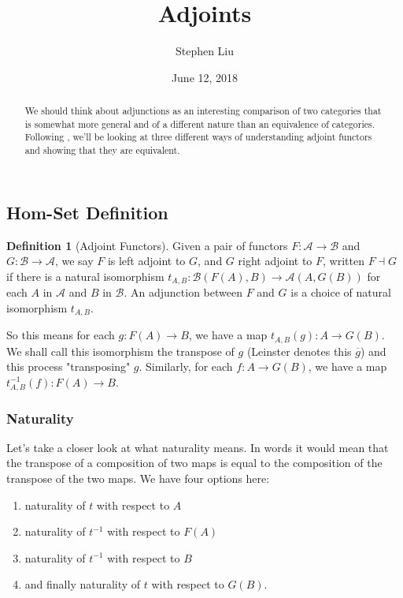 \documentclass[11pt]{article}
\theoremstyle{definition}
\newtheorem*{defn}{Definition}
\theoremstyle{definition}
\theoremstyle{plain}
\theoremstyle{plain}
\theoremstyle{plain}
\begin{document}
\author{Stephen Liu}
\title{Adjoints}
\date{June 12, 2018}

\maketitle

\begin{abstract}
We should think about adjunctions as an interesting comparison of two categories that is somewhat more general and of a different nature than an equivalence of categories. Following \cite{leinster_basic_2014}, we'll be looking at three different ways of understanding adjoint functors and showing that they are equivalent.
\end{abstract}

\subsection*{Hom-Set Definition}
\begin{defn}[Adjoint Functors]
Given a pair of functors $F:\mathscr{A}\to\mathscr{B}$ and $G:\mathscr{B}\to\mathscr{A}$, we say $F$ is left adjoint to $G$, and $G$ right adjoint to $F$, written $F \dashv G$ if there is a natural isomorphism $t_{A,B}:\mathscr{B}(F(A),B) \to \mathscr{A}(A,G(B))$ for each $A$ in $\mathscr{A}$ and $B$ in $\mathscr{B}$. An adjunction between $F$ and $G$ is a choice of natural isomorphism $t_{A,B}$.
\end{defn}

So this means for each $g:F(A) \to B$, we have a map $t_{A,B}(g): A \to G(B)$. We shall call this isomorphism the transpose of $g$ (Leinster denotes this $\overline{g}$) and this process "transposing" $g$. Similarly, for each $f: A \to G(B)$, we have a map $t^{-1}_{A,B}(f): F(A) \to B$.

\subsubsection*{Naturality}
Let's take a closer look at what naturality means. In words it would mean that the transpose of a composition of two maps is equal to the composition of the transpose of the two maps. We have four options here:
\begin{enumerate}
\item naturality of $t$ with respect to $A$
\item naturality of $t^{-1}$ with respect to $F(A)$
\item naturality of $t^{-1}$ with respect to $B$
\item and finally naturality of $t$ with respect to $G(B)$.
\end{enumerate}
\end{document}

